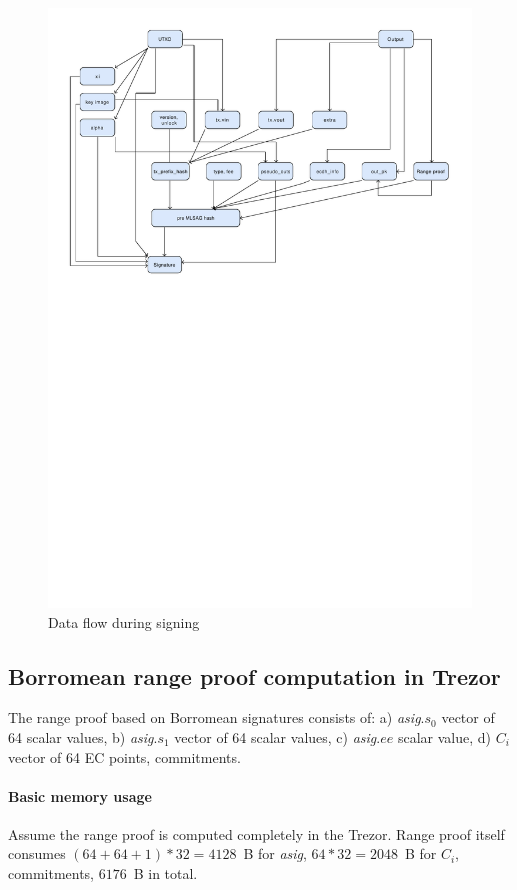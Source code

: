 \documentclass[]{article}
\begin{document}
\begin{figure}[H]
	\centering
	\includegraphics[width=1.\textwidth,trim={0 16cm 0 1cm},clip, angle=0]{img/data_flow.pdf}
	\caption{Data flow during signing} \label{fig:data_flow}
\end{figure}


\subsection{Borromean range proof computation in Trezor}
The range proof based on Borromean signatures consists of:
a) \emph{asig}.$s_0$ vector of 64 scalar values, 
b) \emph{asig}.$s_1$ vector of 64 scalar values,
c) \emph{asig}.$ee$ scalar value,
d) $C_i$ vector of 64 EC points, commitments.

\paragraph{Basic memory usage}
Assume the range proof is computed completely in the Trezor. Range proof itself consumes $(64 + 64 + 1) * 32 = 4128$~B for \emph{asig}, $64*32 = 2048$~B for $C_i$, commitments, $6176$~B in total.
\end{document}
